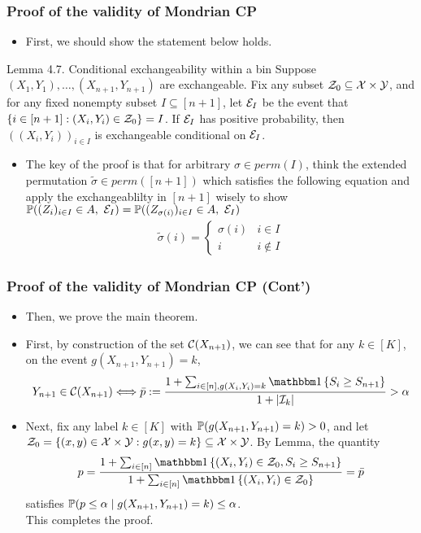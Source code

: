 \documentclass[compress]{beamer}
\begin{document}
\begin{frame}\frametitle{Proof of the validity of Mondrian CP}
	\begin{itemize}
		\item First, we should show the statement below holds.
	\end{itemize}
	\begin{block}{Lemma 4.7. Conditional exchangeability within a bin}
		Suppose $(X_1,Y_1),\dots,(X_{n+1},Y_{n+1})$ are exchangeable. Fix any subset $\cZ_0\subseteq\cX\times\cY$, and for any fixed nonempty subset $I\subseteq[n+1]$, let $\cE_I$ be the event that $\{i \in[n+1]: (X_i,Y_i)\in\cZ_0\} = I$. If $\cE_I$ has positive probability, then $((X_i,Y_i))_{i\in I}$ is exchangeable conditional on $\cE_I$.
	\end{block}
	\begin{itemize}
		\item The key of the proof is that for arbitrary $\sigma \in perm(I)$, think the extended permutation $\tilde{\sigma} \in perm([n+1])$ which satisfies the following equation and apply the exchangeablilty in $[n+1]$ wisely to show $\P((Z_i)_{i\in I}\in A, \ \cE_I) =\P((Z_{\sigma(i)})_{i\in I}\in A, \ \cE_I)$
		\begin{align*}
			\tilde{\sigma}(i) = \begin{cases}
				\sigma(i)&i\in I\\
				i&i\notin I
			\end{cases}
		\end{align*}
	\end{itemize}
\end{frame}



\begin{frame}\frametitle{Proof of the validity of Mondrian CP (Cont')}
	\begin{itemize}
		\item Then, we prove the main theorem.
		\item First, by construction of the set $\cC(X_{n+1})$, we can see that for any $k\in[K]$, on the event $g(X_{n+1},Y_{n+1})=k$, 
		\small{\begin{equation*}\label{eqn:conformal-via-pvalues_for_mondrian}Y_{n+1}\in \cC(X_{n+1}) \Longleftrightarrow \bar{p}:=\frac{1+\sum_{i\in[n],g(X_i,Y_i) = k}\ind{S_i\geq S_{n+1}}}{1+|\cI_k|} >  \alpha\end{equation*}}
		
		\item Next, fix any label $k\in[K]$ with $\P(g(X_{n+1},Y_{n+1})=k)>0$, and let $\cZ_0 = \{(x,y)\in\cX \times\cY: g(x,y)=k\} \subseteq \cX\times \cY$. By Lemma, the quantity
		\[p = \frac{1+\sum_{i\in[n]}\ind{(X_i,Y_i)\in\cZ_0,S_i\geq S_{n+1}}}{1+\sum_{i\in[n]}\ind{(X_i,Y_i)\in\cZ_0}} = \bar{p}\]
		satisfies $\P(p\leq \alpha\mid g(X_{n+1},Y_{n+1})=k)\leq \alpha$.\\ 
		This completes the proof.
	\end{itemize}
	
\end{frame}
\end{document}

